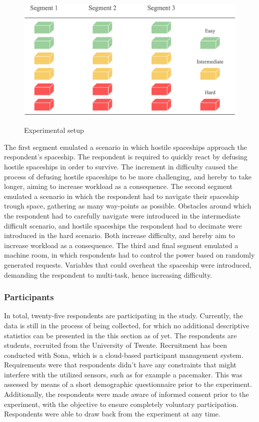 \documentclass[12pt]{article}
\begin{document}
\begin{figure}
\caption{Experimental setup}
\bigskip
\includegraphics[scale=0.4]{experimental_setup}
\label{fig:experimental}
\end{figure}


The first segment emulated a scenario in which hostile spaceships approach the respondent's spaceship. The respondent is required to  quickly react by defusing hostile spaceships in order to survive. The increment in difficulty caused the process of defusing hostile spaceships to be more challenging, and hereby to take longer,  aiming to increase workload as a consequence. The second segment emulated a scenario in which the respondent had to navigate their spaceship trough space, gathering as many way-points as possible. Obstacles around which the respondent had to carefully navigate were introduced in the intermediate difficult scenario, and hostile spaceships the respondent had to decimate were introduced in the hard scenario. Both increase difficulty, and hereby aim to increase workload as a consequence. The third and final segment emulated a machine room, in which respondents had to control the power based on randomly generated requests. Variables that could overheat the spaceship were introduced, demanding the respondent to multi-task, hence increasing difficulty. 

\subsubsection{Participants}
In total, twenty-five respondents are participating in the study. Currently, the data is still in the process of being collected, for which no additional descriptive statistics can be presented in the this section as of yet. The respondents are students, recruited from the University of Twente. Recruitment has been conducted with Sona, which is a cloud-based participant management system. Requirements were that respondents didn't have any constraints that might interfere with the utilized sensors, such as for example a pacemaker. This was assessed by means of a short demographic questionnaire prior to the experiment. Additionally, the respondents were made aware of informed consent prior to the experiment, with the objective to ensure completely voluntary participation. Respondents were able to draw back from the experiment at any time. 
\end{document}
